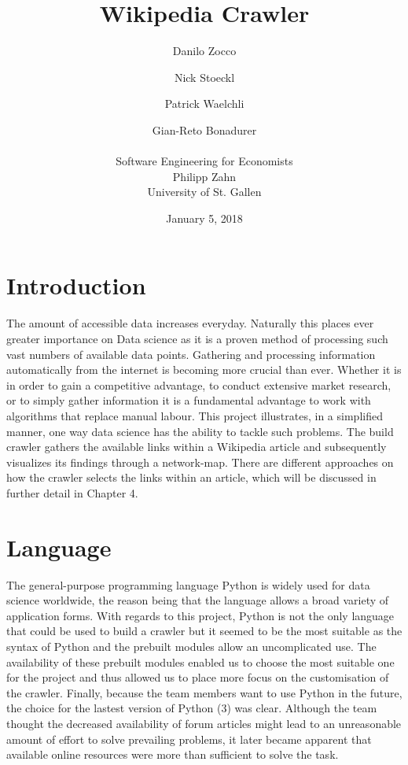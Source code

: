 \documentclass[10pt]{article}
\title{Wikipedia Crawler}
\author{Danilo Zocco
	\and Nick Stoeckl
	\and Patrick Waelchli 
	\and Gian-Reto Bonadurer
	\\ \\
	\small Software Engineering for Economists\\
	\small Philipp Zahn\\
	\small University of St. Gallen}
\date{January 5, 2018}
\begin{document}
\maketitle
\newpage

\tableofcontents
\newpage


\section{Introduction}

The amount of accessible data increases everyday. Naturally this places ever greater importance on Data science as it is a proven method of processing such vast numbers of available data points. \cite{dat} Gathering and processing information automatically from 
the internet is becoming more crucial than ever. Whether it is in order to gain a competitive advantage, to conduct extensive market research, or to simply gather information it is a fundamental advantage to work with algorithms that replace manual labour. 
This project illustrates, in a simplified manner, one way data science has the ability to tackle such problems. The build crawler gathers the available links within a Wikipedia article and subsequently visualizes its findings through a network-map. 
There are different approaches on how the crawler selects the links within an article, which will be discussed in further detail in Chapter 4.

\section{Language}

The general-purpose programming language Python is widely used for data science worldwide, the reason being that the language allows a broad variety of application forms. \cite{pyt} With regards to this project, Python is not the only language that could be used to build a crawler but it seemed to be the most suitable as the syntax of Python and the prebuilt modules allow an uncomplicated use. The availability of these prebuilt modules enabled us to choose the most suitable one for the project and thus allowed us to place more focus on the customisation of the crawler. Finally, because the team members want to use Python in the future, the choice for the lastest version of Python (3) was clear. Although the team thought the decreased availability of forum articles might lead to an unreasonable amount of effort to solve prevailing problems, it later became apparent that available online resources were more than sufficient to solve the task. 
\end{document}

